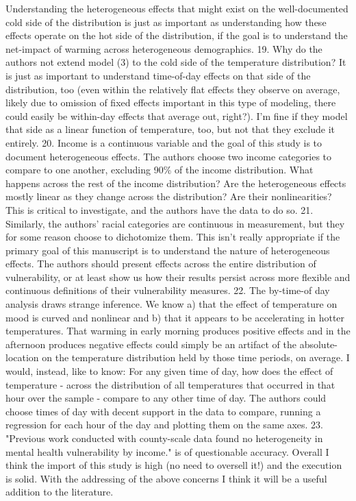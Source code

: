 Understanding the heterogeneous effects that might exist on the well-documented cold side of the distribution is just as important as understanding how these effects operate on the hot side of the distribution, if the goal is to understand the net-impact of warming across heterogeneous demographics.
19. Why do the authors not extend model (3) to the cold side of the temperature distribution? It is just as important to understand time-of-day effects on that side of the distribution, too (even within the relatively flat effects they observe on average, likely due to omission of fixed effects important in this type of modeling, there could easily be within-day effects that average out, right?). I'm fine if they model that side as a linear function of temperature, too, but not that they exclude it entirely.
20. Income is a continuous variable and the goal of this study is to document heterogeneous effects. The authors choose two income categories to compare to one another, excluding 90\% of the income distribution. What happens across the rest of the income distribution? Are the heterogeneous effects mostly linear as they change across the distribution? Are their nonlinearities? This is critical to investigate, and the authors have the data to do so.
21. Similarly, the authors' racial categories are continuous in measurement, but they for some reason choose to dichotomize them. This isn't really appropriate if the primary goal of this manuscript is to understand the nature of heterogeneous effects. The authors should present effects across the entire distribution of vulnerability, or at least show us how their results persist across more flexible and continuous definitions of their vulnerability measures.
22. The by-time-of day analysis draws strange inference. We know a) that the effect of temperature on mood is curved and nonlinear and b) that it appears to be accelerating in hotter temperatures. That warming in early morning produces positive effects and in the afternoon produces negative effects could simply be an artifact of the absolute-location on the temperature distribution held by those time periods, on average. I would, instead, like to know: For any given time of day, how does the effect of temperature - across the distribution of all temperatures that occurred in that hour over the sample - compare to any other time of day. The authors could choose times of day with decent support in the data to compare, running a regression for each hour of the day and plotting them on the same axes.
23. "Previous work conducted with county-scale data found no heterogeneity in mental health vulnerability by income." is of questionable accuracy.
Overall I think the import of this study is high (no need to oversell it!) and the execution is solid. With the addressing of the above concerns I think it will be a useful addition to the literature.






